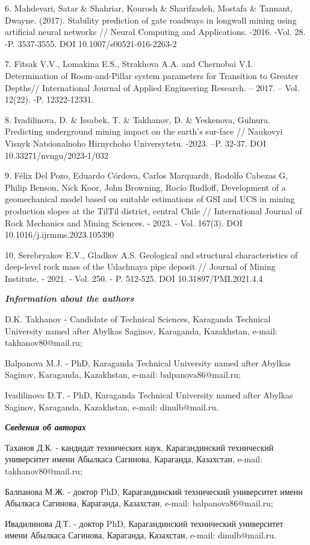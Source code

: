 6. Mahdevari, Satar \& Shahriar, Kourosh \& Sharifzadeh, Mostafa \&
Tannant, Dwayne. (2017). Stability prediction of gate roadways in
longwall mining using artificial neural networks // Neural Computing and
Applications. -2016. -Vol. 28. -P. 3537-3555. DOI
10.1007/s00521-016-2263-2

7. Fitsak V.V., Lomakina E.S., Strakhova A.A. and Chernobai V.I.
Determination of Room-and-Pillar system parameters for Transition to
Greater Depths// International Journal of Applied Engineering Research.
-- 2017. -- Vol. 12(22). -P. 12322-12331.

8. Ivadilinova, D. \& Issabek, T. \& Takhanov, D. \& Yeskenova, Gulnura.
Predicting underground mining impact on the earth's sur-face // Naukovyi
Visnyk Natsionalnoho Hirnychoho Universytetu. -2023. --P. 32-37. DOI
10.33271/nvngu/2023-1/032

9. Félix Del Pozo, Eduardo Córdova, Carlos Marquardt, Rodolfo Cabezas G,
Philip Benson, Nick Koor, John Browning, Rocío Rudloff, Development of a
geomechanical model based on suitable estimations of GSI and UCS in
mining production slopes at the TilTil district, central Chile //
International Journal of Rock Mechanics and Mining Sciences. - 2023. -
Vol. 167(3). DOI 10.1016/j.ijrmms.2023.105390

10. Serebryakov E.V., Gladkov A.S. Geological and structural
characteristics of deep-level rock mass of the Udachnaya pipe deposit //
Journal of Mining Institute. - 2021. - Vol. 250. - P. 512-525. DOI
10.31897/PMI.2021.4.4

\emph{{\bfseries Information about the authors}}

D.K. Takhanov - Candidate of Technical Sciences, Karaganda Technical
University named after Abylkas Saginov, Karaganda, Kazakhstan, e-mail:
takhanov80@mail.ru;

Balpanova M.J. - PhD, Karaganda Technical University named after Abylkas
Saginov, Karaganda, Kazakhstan, e-mail: balpanova86@mail.ru;

Ivadilinova D.T. - PhD, Karaganda Technical University named after
Abylkas Saginov, Karaganda, Kazakhstan, e-mail: dinulb@mail.ru.

\emph{{\bfseries Сведения об авторах}}

Таханов Д.К. - кандидат технических наук, Карагандинский технический
университет имени Абылкаса Сагинова, Караганда, Казахстан, e-mail:
takhanov80@mail.ru;

Балпанова М.Ж. - доктор PhD, Карагандинский технический университет
имени Абылкаса Сагинова, Караганда, Казахстан, e-mail:
balpanova86@mail.ru;

Ивадилинова Д.Т. - доктор PhD, Карагандинский технический университет
имени Абылкаса Сагинова, Караганда, Казахстан, e-mail: dinulb@mail.ru.




